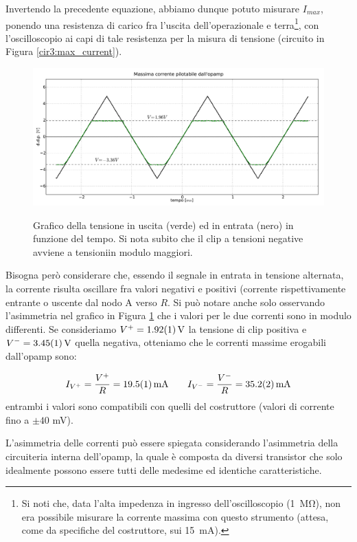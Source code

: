 Invertendo la precedente equazione, abbiamo dunque potuto misurare $I_{max}$, ponendo una resistenza di carico fra l'uscita dell'operazionale e terra\footnote{Si noti che, data l'alta impedenza in ingresso dell'oscilloscopio (\SI{1}{\mega\ohm}), non era possibile misurare la corrente massima con questo strumento (attesa, come da specifiche del costruttore, sui \SI{15}{\milli\ampere}).}, con l'oscilloscopio ai capi di tale resistenza per la misura di tensione (circuito in Figura \ref{cir3:max_current}).

\begin{figure}[ht]
 \centering
   {\includegraphics[width=\textwidth]{../E03/latex/clip.pdf}}
 \caption{Grafico della tensione in uscita (verde) ed in entrata (nero) in funzione del tempo. Si nota subito che il clip a tensioni negative avviene a tensioniin modulo maggiori.}
 \label{gr3:clip}
\end{figure}

Bisogna però considerare che, essendo il segnale in entrata in tensione alternata, la corrente risulta oscillare fra valori negativi e positivi (corrente rispettivamente entrante o uscente dal nodo A verso $R$.
Si può notare anche solo osservando l'asimmetria nel grafico in Figura \ref{gr3:clip} che i valori per le due correnti sono in modulo differenti.
Se consideriamo $V^+ = \SI{1.92 \pm 0.01}{\volt}$ la tensione di clip positiva e $V^- = \SI{3.45 \pm 0.01}{\volt}$ quella negativa, otteniamo che le correnti massime erogabili dall'opamp sono:

$$I_{V^+} = \frac{V^+}{R} = \SI{19.5 \pm 0.1}{\mA}  \qquad I_{V^-} = \frac{V^-}{R} = \SI{35.2 \pm 0.2}{\mA}$$
entrambi i valori sono compatibili con quelli del costruttore (valori di corrente fino a $\pm 40$ \si{\milli\volt}).

L'asimmetria delle correnti può essere spiegata considerando l'asimmetria della circuiteria interna dell'opamp, la quale è composta da diversi transistor che solo idealmente possono essere tutti delle medesime ed identiche caratteristiche.

